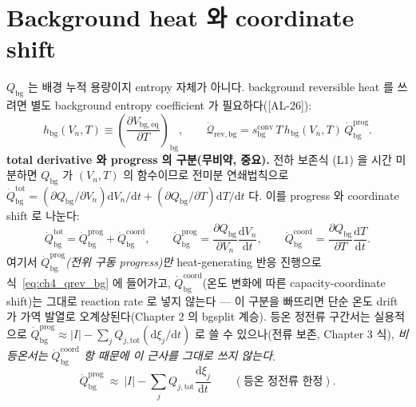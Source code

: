 \documentclass[11pt,a4paper]{article}
\newcommand{\dd}{\mathrm{d}}
\newcommand{\eq}{\mathrm{eq}}
\newcommand{\bg}{\mathrm{bg}}
\newcommand{\tot}{\mathrm{tot}}
\newcommand{\rev}{\mathrm{rev}}
\newcommand{\conv}{\mathrm{conv}}
\newcommand{\prog}{\mathrm{prog}}
\newcommand{\coord}{\mathrm{coord}}
\newcommand{\AL}[1]{\textsf{[AL-#1]}}
\begin{document}
\section{Background heat 와 coordinate shift}\label{sec:ch4_bg}
$Q_\bg$ 는 배경 누적 용량이지 entropy 자체가 아니다. background reversible heat 를 쓰려면 별도 background
entropy coefficient 가 필요하다(\AL{26}):
\begin{equation}
h_\bg(V_n,T)\equiv\left(\frac{\partial V_{\bg,\eq}}{\partial T}\right)_{\mathrm{bg}},\qquad
\dot{\mathcal Q}_{\rev,\bg}=s_\bg^{\conv}\,T\,h_\bg(V_n,T)\,\dot Q_\bg^{\prog}.
\label{eq:ch4_qrev_bg}
\end{equation}
\textbf{total derivative 와 progress 의 구분(무비약, 중요).} 전하 보존식 (L1) 을 시간 미분하면 $Q_\bg$ 가
$(V_n,T)$ 의 함수이므로 전미분 연쇄법칙으로 $\dot Q_\bg^{\mathrm{tot}}=(\partial Q_\bg/\partial V_n)\dd V_n/\dd t
+(\partial Q_\bg/\partial T)\dd T/\dd t$ 다. 이를 progress 와 coordinate shift 로 나눈다:
\begin{equation}
\dot Q_\bg^{\mathrm{tot}}=\dot Q_\bg^{\prog}+\dot Q_\bg^{\coord},\qquad
\dot Q_\bg^{\prog}=\frac{\partial Q_\bg}{\partial V_n}\frac{\dd V_n}{\dd t},\qquad
\dot Q_\bg^{\coord}=\frac{\partial Q_\bg}{\partial T}\frac{\dd T}{\dd t}.
\label{eq:ch4_qbg_split}
\end{equation}
여기서 \emph{$\dot Q_\bg^{\prog}$(전위 구동 progress)만} heat-generating 반응 진행으로 식~\eqref{eq:ch4_qrev_bg}
에 들어가고, $\dot Q_\bg^{\coord}$(온도 변화에 따른 capacity-coordinate shift)는 그대로 reaction rate 로 넣지
않는다 — 이 구분을 빠뜨리면 단순 온도 drift 가 가역 발열로 오계상된다(Chapter 2 의 bgsplit 계승). 등온 정전류
구간서는 실용적으로 $\dot Q_\bg^{\prog}\approx|I|-\sum_j Q_{j,\tot}(\dd\xi_j/\dd t)$ 로 쓸 수 있으나(전류 보존,
Chapter 3 식), \emph{비등온서는 $\dot Q_\bg^{\coord}$ 항 때문에 이 근사를 그대로 쓰지 않는다}.
\begin{equation}
\dot Q_\bg^{\prog}\ \approx\ |I|-\sum_j Q_{j,\tot}\frac{\dd\xi_j}{\dd t}\qquad(\text{등온 정전류 한정}).
\label{eq:ch4_qbg_iso}
\end{equation}

\end{document}
